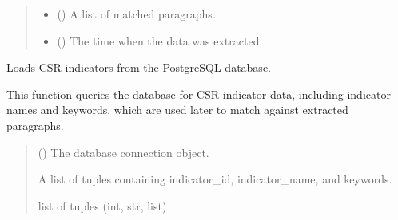 \documentclass[letterpaper,10pt,english]{sphinxmanual}
\begin{document}
\begin{fulllineitems}
\begin{quote}
\begin{description}
\begin{itemize}
\item {} 
\sphinxAtStartPar
{} () \textendash{} A list of matched paragraphs.

\item {} 
\sphinxAtStartPar
{} () \textendash{} The time when the data was extracted.

\end{itemize}

\end{description}\end{quote}

\end{fulllineitems}


\begin{fulllineitems}
\label{\detokenize{modules.data_storage:modules.data_storage.retry_failed_reports.load_indicators_from_db}}
\pysigstartsignatures
\pysiglinewithargsret
{}
{}
{}
\pysigstopsignatures
\sphinxAtStartPar
Loads CSR indicators from the PostgreSQL database.

\sphinxAtStartPar
This function queries the database for CSR indicator data, including indicator
names and keywords, which are used later to match against extracted paragraphs.
\begin{quote}\begin{description}
\sphinxAtStartPar
{} () \textendash{} The database connection object.

\sphinxAtStartPar
A list of tuples containing indicator\_id, indicator\_name, and keywords.

\sphinxAtStartPar
list of tuples (int, str, list)

\end{description}\end{quote}

\end{fulllineitems}
\end{document}
